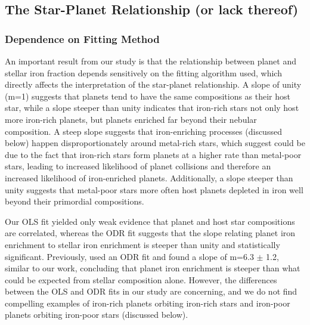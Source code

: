 \documentclass[twocolumn]{aastex631}
\begin{document}
\subsection{The Star-Planet Relationship (or lack thereof)}
\subsubsection{Dependence on Fitting Method}
An important result from our study is that the relationship between planet and stellar iron fraction depends sensitively on the fitting algorithm used, which directly affects the interpretation of the star-planet relationship. A slope of unity (m=1) suggests that planets tend to have the same compositions as their host star, while a slope steeper than unity indicates that iron-rich stars not only host more iron-rich planets, but planets enriched far beyond their nebular composition. A steep slope suggests that iron-enriching processes (discussed below) happen disproportionately around metal-rich stars, which \cite{Adibekyan2021} suggest could be due to the fact that iron-rich stars form planets at a higher rate than metal-poor stars, leading to increased likelihood of planet collisions and therefore an increased likelihood of iron-enriched planets. Additionally, a slope steeper than unity suggests that metal-poor stars more often host planets depleted in iron well beyond their primordial compositions. 

Our OLS fit yielded only weak evidence that planet and host star compositions are correlated, whereas the ODR fit suggests that the slope relating planet iron enrichment to stellar iron enrichment is steeper than unity and statistically significant. Previously, \cite{Adibekyan2021} used an ODR fit and found a slope of m=6.3 $\pm$ 1.2, similar to our work, concluding that planet iron enrichment is steeper than what could be expected from stellar composition alone. However, the differences between the OLS and ODR fits in our study are concerning, and we do not find compelling examples of iron-rich planets orbiting iron-rich stars and iron-poor planets orbiting iron-poor stars (discussed below).

\end{document}
